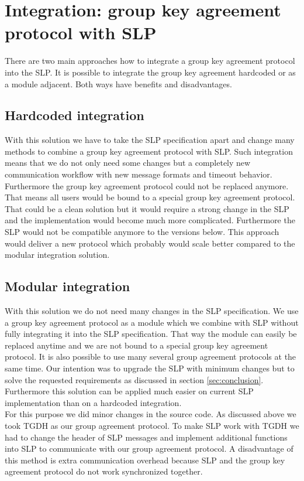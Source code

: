 \section{Integration: group key agreement protocol with SLP}
There are two main approaches how to integrate a group key agreement protocol into the SLP. It is possible to integrate the group key agreement hardcoded or as a module adjacent. Both ways have benefits and disadvantages. 

\subsection{Hardcoded integration}
With this solution we have to take the SLP specification apart and change many methods to combine a group key agreement protocol with SLP. Such integration means that we do not only need some changes but a completely new communication workflow with new message formats and timeout behavior. Furthermore the group key agreement protocol could not be replaced anymore. That means all users would be bound to a special group key agreement protocol. That could be a clean solution but it would require a strong change in the SLP and the implementation would become much more complicated. Furthermore the SLP would not be compatible anymore to the versions below. This approach would deliver a new protocol which probably would scale better compared to the modular integration solution.

\subsection{Modular integration}
With this solution we do not need many changes in the SLP specification. We use a group key agreement protocol as a module which we combine with SLP without fully integrating it into the SLP specification. That way the module can easily be replaced anytime and we are not bound to a special group key agreement protocol. It is also possible to use many several group agreement protocols at the same time. Our intention was to upgrade the SLP with minimum changes but to solve the requested requirements as discussed in section \ref{sec:conclusion}. Furthermore this solution can be applied much easier on current SLP implementation than on a hardcoded integration.\\
For this purpose we did minor changes in the source code. As discussed above we took TGDH as our group agreement protocol. To make SLP work with TGDH we had to change the header of SLP messages and implement additional functions into SLP to communicate with our group agreement protocol. A disadvantage of this method is extra communication overhead because SLP and the group key agreement protocol do not work synchronized together.